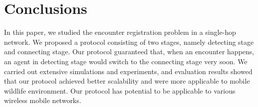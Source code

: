 \section{Conclusions}
\label{sectionconclusion}
\vspace{-0.01in}
In this paper, we studied the encounter registration problem in a single-hop network.
We proposed a protocol consisting of two stages, namely detecting stage and 
connecting stage. Our protocol guaranteed that, when an encounter happens, 
an agent in detecting stage would switch 
to the connecting stage very soon. 
We carried out extensive simulations and experiments, and 
evaluation results showed that our protocol achieved 
better scalability and were more applicable to mobile
wildlife environment. Our protocol has potential to be applicable
to various wireless mobile networks.

